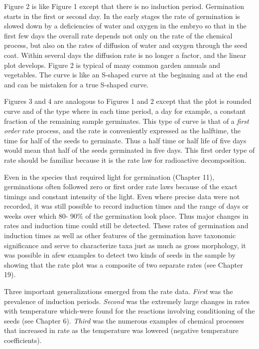 Figure 2 is like Figure 1 except that there is no induction period. Germination
starts in the first or second day. In the early stages the rate of germination is slowed
down by a deficiencies of water and oxygen in the embryo so that in the first few days
the overall rate depends not only on the rate of the chemical process, but also on the
rates of diffusion of water and oxygen through the seed coat. Within several days the
diffusion rate is no longer a factor, and the linear plot develops. Figure 2 is typical of
many common garden annuals and vegetables. The curve is like an S-shaped curve
at the beginning and at the end and can be mistaken for a true S-shaped curve.

Figures 3 and 4 are analogous to Figures 1 and 2 except that the plot is
rounded curve and of the type where in each time period, a day for example, a
constant fraction of the remaining sample germinates. This type of curve is that of a
\textit{first order} rate process, and the rate is conveniently expressed as the halftime, the
time for half of the seeds to germinate. Thus a half time or half life of five days would
mean that half of the seeds germinated in five days. This first order type of rate should
be familiar because it is the rate law for radioactive decomposition.

Even in the species that required light for germination (Chapter 11),
germinations often followed zero or first order rate laws because of the exact timings
and constant intensity of the light. Even where precise data were not recorded, it was
still possible to record induction times and the range of days or weeks over which 80-
90\% of the germination look place. Thus major changes in rates and induction time
could still be detected. These rates of germination and induction times as well as
other features of the germination have taxonomic significance and serve to
characterize taxa just as much as gross morphology, it was possible in afew examples
to detect two kinds of seeds in the sample by showing that the rate plot was a
composite of two separate rates (see Chapter 19).

Three important generalizations emerged from the rate data. \textit{First} was the
prevalence of induction periods. \textit{Second} was the extremely large changes in rates
with temperature which-were found for the reactions involving conditioning of the
seeds (see Chapter 6). \textit{Third} was the numerous examples of chemical processes that
increased in rate as the temperature was lowered (negative temperature coefficients).

